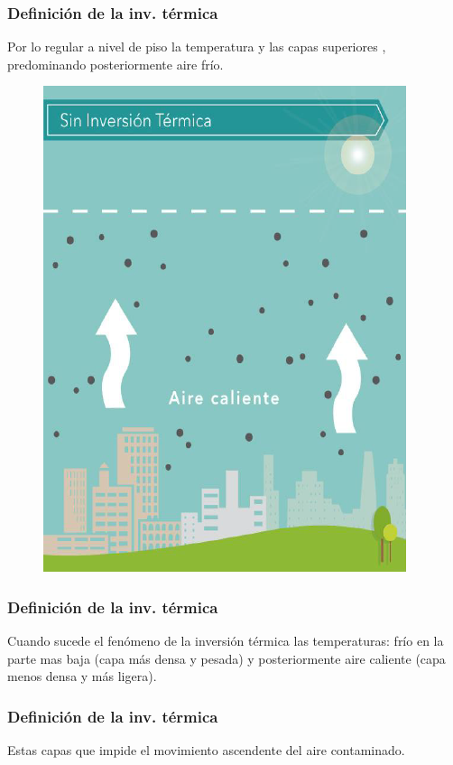 \documentclass[14pt]{beamer}
\begin{document}
\begin{frame}
\frametitle{Definición de la inv. térmica}
Por lo regular a nivel de piso la temperatura  \pause y las capas superiores , predominando posteriormente aire frío.
\end{frame}
\begin{frame}
\begin{figure}
    \centering
    \includegraphics[scale=0.5]{Imagenes/Inversion_Termica_01.png}
\end{figure}
\end{frame}
\begin{frame}
\frametitle{Definición de la inv. térmica}
Cuando sucede el fenómeno de la inversión térmica  las temperaturas: \pause frío en la parte mas baja (capa más densa y pesada) \pause y posteriormente aire caliente (capa menos densa y más ligera).
\end{frame}
\begin{frame}
\frametitle{Definición de la inv. térmica}
Estas capas  que impide el movimiento ascendente del aire contaminado.
\end{frame}
\end{document}
